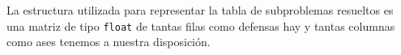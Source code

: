 La estructura utilizada para representar la tabla de subproblemas resueltos es una matriz de tipo \texttt{float} de tantas filas como defensas hay y tantas columnas como ases tenemos a nuestra disposición.
